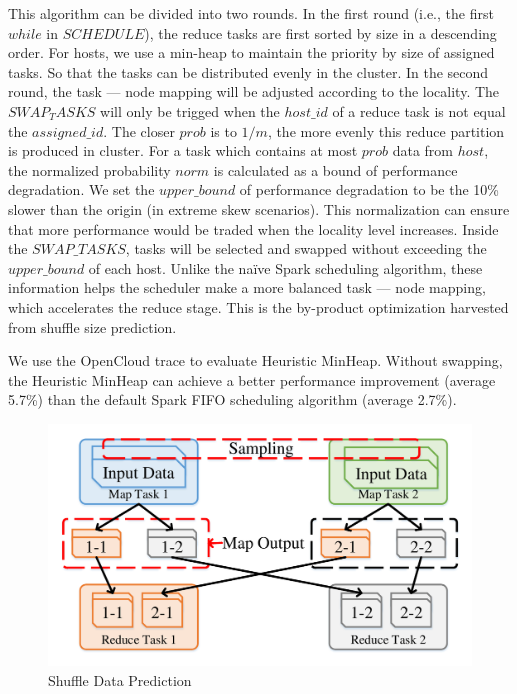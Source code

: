 This algorithm can be divided into two rounds. In the first round (i.e., the first $while$ in $SCHEDULE$), the reduce tasks are first sorted by size in a descending order. For hosts, we use a min-heap to maintain the priority by size of assigned tasks. So that the tasks can be distributed evenly in the cluster.
In the second round, the task --- node mapping will be adjusted according to the locality. 
The $SWAP_TASKS$ will only be trigged when the $host\_id$ of a reduce task is not equal the $assigned\_id$.
The closer $prob$ is to $1/m$, the more evenly this reduce partition is produced in cluster. For a task which contains at most $prob$ data from $host$, the normalized probability $norm$ is calculated as a bound of performance degradation. We set the $upper\_bound$ of performance degradation to be the 10\% slower than the origin (in extreme skew scenarios). This normalization can ensure that more performance would be traded when the locality level increases. 
Inside the $SWAP\_TASKS$, tasks will be selected and swapped without exceeding the $upper\_bound$ of each host. 
Unlike the na\"{i}ve Spark scheduling algorithm, these information helps the scheduler make a more balanced task --- node mapping, which accelerates the reduce stage. This is the by-product optimization harvested from shuffle size prediction.

We use the OpenCloud \cite{opencloudtrace} trace to evaluate Heuristic MinHeap. Without swapping, the Heuristic MinHeap can achieve a better performance improvement (average 5.7\%) than the default Spark FIFO scheduling algorithm (average 2.7\%).


\begin{figure}
	\centering
	\includegraphics[width=0.9\linewidth]{fig/shuffle}
	\caption{Shuffle Data Prediction}
	\label{fig:shuffle}
\end{figure}

